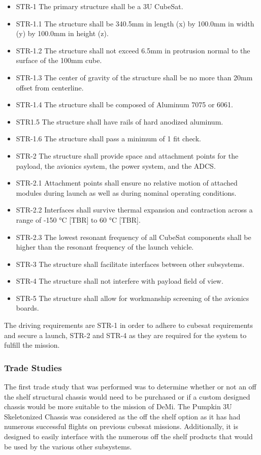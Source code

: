 \documentclass[12pt]{article}
\begin{document}
\begin{itemize}
\item STR-1 The primary structure shall be a 3U CubeSat.
\item STR-1.1 The structure shall be 340.5mm in length (x) by 100.0mm in width (y) by 100.0mm in height (z).
\item STR-1.2 The structure shall not exceed 6.5mm in protrusion normal to the surface of the 100mm cube.             
\item STR-1.3 The center of gravity of the structure shall be no more than 20mm offset from centerline.
\item STR-1.4 The structure shall be composed of Aluminum 7075 or 6061.
\item STR1.5 The structure shall have rails of hard anodized aluminum.
\item STR-1.6 The structure shall pass a minimum of 1 fit check.
\item STR-2 The structure shall provide space and attachment points for the payload, the avionics system, the power system, and the ADCS.
\item STR-2.1 Attachment points shall ensure no relative motion of attached modules during launch as well as during nominal operating conditions.
\item STR-2.2 Interfaces shall survive thermal expansion and contraction across a range of -150 °C [TBR] to 60 °C [TBR].
\item STR-2.3 The lowest resonant frequency of all CubeSat components shall be higher than the resonant frequency of the launch vehicle.
\item STR-3 The structure shall facilitate interfaces between other subsystems.
\item STR-4 The structure shall not interfere with payload field of view.
\item STR-5 The structure shall allow for workmanship screening of the avionics boards.

\end{itemize}

The driving requirements are STR-1 in order to adhere to cubesat requirements and secure a launch, STR-2 and STR-4 as they are required for the system to fulfill the mission.

\subsubsection{Trade Studies}
The first trade study that was performed was to determine whether or not an off the shelf structural chassis would need to be purchased or if a custom designed chassis would be more suitable to the mission of DeMi. The Pumpkin 3U Skeletonized Chassis was considered as the off the shelf option as it has had numerous successful flights on previous cubesat missions. Additionally, it is designed to easily interface with the numerous off the shelf products that would be used by the various other subsystems.
\end{document}
